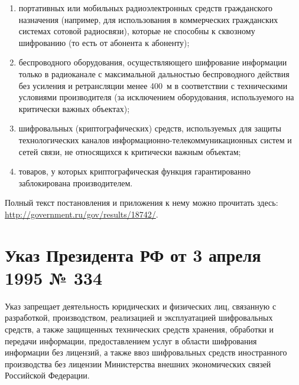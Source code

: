 {\begin{enumerate}
\item портативных или мобильных радиоэлектронных средств гражданского назначения (например, для использования в коммерческих гражданских системах сотовой радиосвязи), которые не способны к сквозному шифрованию (то есть от абонента к абоненту);
\item беспроводного оборудования, осуществляющего шифрование информации только в радиоканале с максимальной дальностью беспроводного действия без усиления и ретрансляции менее 400 м в соответствии с техническими условиями производителя (за исключением оборудования, используемого на критически важных объектах);
\item шифровальных (криптографических) средств, используемых для защиты технологических каналов информационно-телекоммуникационных систем и сетей связи, не относящихся к критически важным объектам;
\item товаров, у которых криптографическая функция гарантированно заблокирована производителем.
\end{enumerate}
Полный текст постановления и приложения к нему можно прочитать здесь: \url{http://government.ru/gov/results/18742/}.
\section{Указ Президента РФ от 3 апреля 1995 № 334}
Указ запрещает деятельность юридических и физических лиц, связанную с разработкой, производством, реализацией и эксплуатацией шифровальных средств, а также защищенных технических средств хранения, обработки и передачи информации, предоставлением услуг в области шифрования информации без лицензий, а также ввоз шифровальных средств иностранного производства без лицензии Министерства внешних экономических связей Российской Федерации\cite{334}.
}
